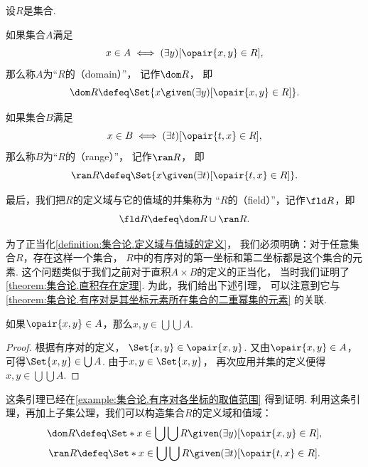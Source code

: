 \begin{definition}\label{definition:集合论.定义域与值域的定义}
    设\(R\)是集合.

    如果集合\(A\)满足
    \begin{equation*}
        x \in A \iff (\exists y)[\opair{x,y} \in R],
    \end{equation*}
    那么称\(A\)为“\(R\)的（domain）”，
    记作\(\dom R\)，
    即
    \begin{equation*}
        \dom R
        \defeq
        \Set{
        x
        \given
        (\exists y)[\opair{x,y} \in R]
        }.
    \end{equation*}

    如果集合\(B\)满足
    \begin{equation*}
        x \in B \iff (\exists t)[\opair{t,x} \in R],
    \end{equation*}
    那么称\(B\)为“\(R\)的（range）”，
    记作\(\ran R\)，
    即
    \begin{equation*}
        \ran R
        \defeq
        \Set{
        x
        \given
        (\exists t)[\opair{t,x} \in R]
        }.
    \end{equation*}

    最后，我们把\(R\)的定义域与它的值域的并集称为
    “\(R\)的（field）”，记作\(\fld R\)，即
    \begin{equation*}
        \fld R \defeq \dom R \cup \ran R.
    \end{equation*}
\end{definition}

为了正当化\cref{definition:集合论.定义域与值域的定义}，
我们必须明确：对于任意集合\(R\)，存在这样一个集合，
\(R\)中的有序对的第一坐标和第二坐标都是这个集合的元素.
这个问题类似于我们之前对于直积\(A \times B\)的定义的正当化，
当时我们证明了\cref{theorem:集合论.直积存在定理}.
为此，我们给出下述引理，
可以注意到它与\cref{theorem:集合论.有序对是其坐标元素所在集合的二重幂集的元素} 的关联.

\begin{lemma}
    如果\(\opair{x,y} \in A\)，那么\(x,y \in \bigcup\bigcup A\).
    \begin{proof}
        根据有序对的定义，
        \(\Set{x,y}\in\opair{x,y}\).
        又由\(\opair{x,y}\in A\)，
        可得\(\Set{x,y}\in\bigcup A\).
        由于\(x,y\in\Set{x,y}\)，
        再次应用并集的定义便得\(x,y\in\bigcup\bigcup A\).
    \end{proof}
\end{lemma}
这条引理已经在\cref{example:集合论.有序对各坐标的取值范围} 得到证明.
利用这条引理，再加上子集公理，我们可以构造集合\(R\)的定义域和值域：
\begin{gather}
    \dom R
    \defeq
    \Set*{ x \in \bigcup\bigcup R \given (\exists y)[\opair{x,y} \in R] }, \\
    \ran R
    \defeq
    \Set*{ x \in \bigcup\bigcup R \given (\exists t)[\opair{t,x} \in R] }.
\end{gather}

